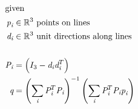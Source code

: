 \documentclass[12pt]{article}
\begin{document}
\begin{center}
\resizebox{\textwidth}{!} 
{
\begin{minipage}[c]{\textwidth}
\begin{align*}
\intertext{given} 
\textit{p}_{\textit{i}} & \in \mathbb{R}^{ 3} \text{ points on lines} \\
\textit{d}_{\textit{i}} & \in \mathbb{R}^{ 3} \text{ unit directions along lines} \\
\\
\textit{P}_{ \textit{i} } & = \left( I_{ 3 } - \textit{d}_{ \textit{i} }\textit{d}_{ \textit{i} }^T \right) \\
\textit{q} & = \left( \sum_\textit{i} \textit{P}_{ \textit{i} }^T\textit{P}_{ \textit{i} } \right)^{-1}\left( \sum_\textit{i} \textit{P}_{ \textit{i} }^T\textit{P}_{ \textit{i} }\textit{p}_{ \textit{i} } \right) \\
\end{align*}
\end{minipage}
}
\end{center}
\end{document}
